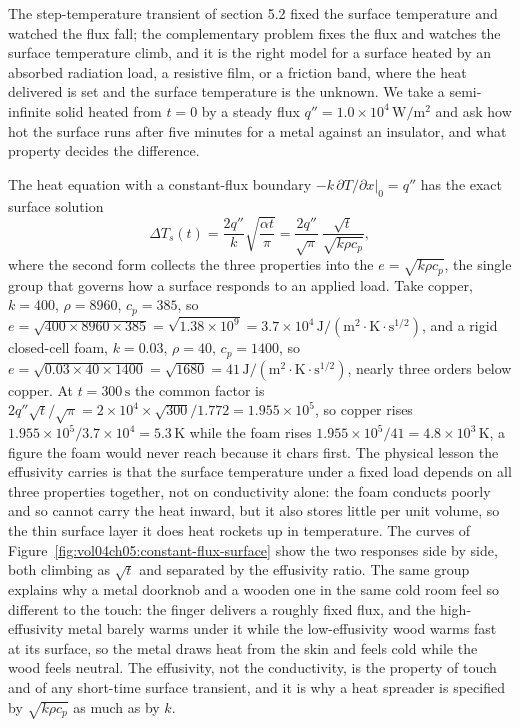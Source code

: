 The step-temperature transient of section 5.2 fixed the surface temperature
and watched the flux fall; the complementary problem fixes the flux and
watches the surface temperature climb, and it is the right model for a
surface heated by an absorbed radiation load, a resistive film, or a friction
band, where the heat delivered is set and the surface temperature is the
unknown. We take a semi-infinite solid heated from $t = 0$ by a steady flux
$q'' = 1.0\times10^4\,\text{W}/\text{m}^2$ and ask how hot the surface runs
after five minutes for a metal against an insulator, and what property decides
the difference.

The heat equation with a constant-flux boundary
$-k\,\partial T/\partial x|_0 = q''$ has the exact surface solution
\[
\Delta T_s(t) = \frac{2 q''}{k}\sqrt{\frac{\alpha t}{\pi}} =
\frac{2 q''}{\sqrt{\pi}}\,\frac{\sqrt{t}}{\sqrt{k\rho c_p}},
\]
where the second form collects the three properties into the
 $e = \sqrt{k\rho c_p}$, the single group that
governs how a surface responds to an applied load. Take copper, $k = 400$,
$\rho = 8960$, $c_p = 385$, so $e = \sqrt{400\times8960\times385} =
\sqrt{1.38\times10^9} = 3.7\times10^4\,\text{J}/(\text{m}^2\cdot\si{\kelvin}
\cdot\text{s}^{1/2})$, and a rigid closed-cell foam, $k = 0.03$, $\rho = 40$,
$c_p = 1400$, so $e = \sqrt{0.03\times40\times1400} = \sqrt{1680} = 41\,
\text{J}/(\text{m}^2\cdot\si{\kelvin}\cdot\text{s}^{1/2})$, nearly three
orders below copper. At $t = 300\,\text{s}$ the common factor is
$2 q''\sqrt{t}/\sqrt{\pi} = 2\times10^4\times\sqrt{300}/1.772 = 1.955\times
10^5$, so copper rises $1.955\times10^5/3.7\times10^4 = 5.3\,\si{\kelvin}$
while the foam rises $1.955\times10^5/41 = 4.8\times10^3\,\si{\kelvin}$,
a figure the foam would never reach because it chars first. The physical
lesson the effusivity carries is that the surface temperature under a fixed
load depends on all three properties together, not on conductivity alone: the
foam conducts poorly and so cannot carry the heat inward, but it also stores
little per unit volume, so the thin surface layer it does heat rockets up in
temperature. The curves of Figure~\ref{fig:vol04ch05:constant-flux-surface}
show the two responses side by side, both climbing as $\sqrt{t}$ and separated
by the effusivity ratio. The same group explains why a metal doorknob and a
wooden one in the same cold room feel so different to the touch: the finger
delivers a roughly fixed flux, and the high-effusivity metal barely warms
under it while the low-effusivity wood warms fast at its surface, so the metal
draws heat from the skin and feels cold while the wood feels neutral. The
effusivity, not the conductivity, is the property of touch and of any
short-time surface transient, and it is why a heat spreader is specified by
$\sqrt{k\rho c_p}$ as much as by $k$.

